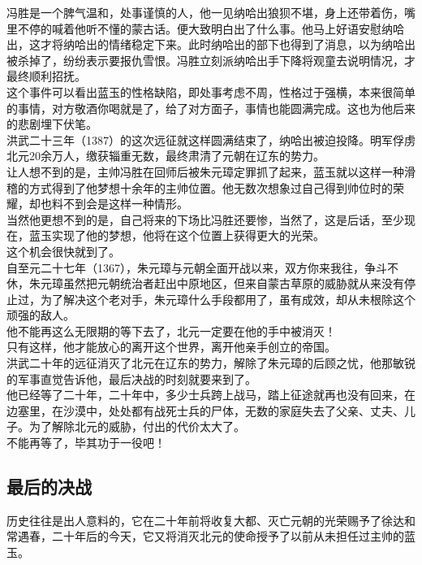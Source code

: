 \begin{multicols}{\theparacolNo}
冯胜是一个脾气温和，处事谨慎的人，他一见纳哈出狼狈不堪，身上还带着伤，嘴里不停的喊着他听不懂的蒙古话。便大致明白出了什么事。他马上好语安慰纳哈出，这才将纳哈出的情绪稳定下来。此时纳哈出的部下也得到了消息，以为纳哈出被杀掉了，纷纷表示要报仇雪恨。冯胜立刻派纳哈出手下降将观童去说明情况，才最终顺利招抚。\\

这个事件可以看出蓝玉的性格缺陷，即处事考虑不周，性格过于强横，本来很简单的事情，对方敬酒你喝就是了，给了对方面子，事情也能圆满完成。这也为他后来的悲剧埋下伏笔。\\

洪武二十三年（1387）的这次远征就这样圆满结束了，纳哈出被迫投降。明军俘虏北元20余万人，缴获辎重无数，最终肃清了元朝在辽东的势力。\\

让人想不到的是，主帅冯胜在回师后被朱元璋定罪抓了起来，蓝玉就以这样一种滑稽的方式得到了他梦想十余年的主帅位置。他无数次想象过自己得到帅位时的荣耀，却也料不到会是这样一种情形。\\

当然他更想不到的是，自己将来的下场比冯胜还要惨，当然了，这是后话，至少现在，蓝玉实现了他的梦想，他将在这个位置上获得更大的光荣。\\

这个机会很快就到了。\\

自至元二十七年（1367），朱元璋与元朝全面开战以来，双方你来我往，争斗不休，朱元璋虽然把元朝统治者赶出中原地区，但来自蒙古草原的威胁就从来没有停止过，为了解决这个老对手，朱元璋什么手段都用了，虽有成效，却从未根除这个顽强的敌人。\\

他不能再这么无限期的等下去了，北元一定要在他的手中被消灭！\\

只有这样，他才能放心的离开这个世界，离开他亲手创立的帝国。\\

洪武二十年的远征消灭了北元在辽东的势力，解除了朱元璋的后顾之忧，他那敏锐的军事直觉告诉他，最后决战的时刻就要来到了。\\

他已经等了二十年，二十年中，多少士兵跨上战马，踏上征途就再也没有回来，在边塞里，在沙漠中，处处都有战死士兵的尸体，无数的家庭失去了父亲、丈夫、儿子。为了解除北元的威胁，付出的代价太大了。\\

不能再等了，毕其功于一役吧！\\

\subsection{最后的决战}
历史往往是出人意料的，它在二十年前将收复大都、灭亡元朝的光荣赐予了徐达和常遇春，二十年后的今天，它又将消灭北元的使命授予了以前从未担任过主帅的蓝玉。\\


\end{multicols}
